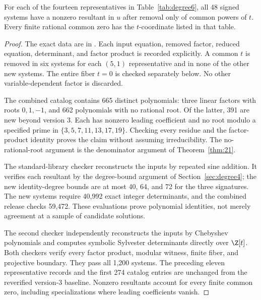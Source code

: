 \begin{lemma}\label{lem:degree6data}
For each of the fourteen representatives in Table~\ref{tab:degree6}, all 48 signed systems have a nonzero resultant in $u$ after removal only of common powers of $t$. Every finite rational common zero has the $t$-coordinate listed in that table.
\end{lemma}
\begin{proof}
The exact data are in . Each input equation, removed factor, reduced equation, determinant, and factor product is recorded explicitly. A common $t$ is removed in six systems for each $(5,1)$ representative and in none of the other new systems. The entire fiber $t=0$ is checked separately below. No other variable-dependent factor is discarded.

The combined catalog contains 665 distinct polynomials: three linear factors with roots $0,1,-1$, and 662 polynomials with no rational root. Of the latter, 391 are new beyond version 3. Each has nonzero leading coefficient and no root modulo a specified prime in $\{3,5,7,11,13,17,19\}$. Checking every residue and the factor-product identity proves the claim without assuming irreducibility. The no-rational-root argument is the denominator argument of Theorem~\ref{thm:21}.

The standard-library checker reconstructs the inputs by repeated sine addition. It verifies each resultant by the degree-bound argument of Section~\ref{sec:degree4}; the new identity-degree bounds are at most 40, 64, and 72 for the three signatures. The new systems require 40,992 exact integer determinants, and the combined release checks 59,472. These evaluations prove polynomial identities, not merely agreement at a sample of candidate solutions.

The second checker independently reconstructs the inputs by Chebyshev polynomials and computes symbolic Sylvester determinants directly over $\Z[t]$. Both checkers verify every factor product, modular witness, finite fiber, and projective boundary. They pass all 1,200 systems. The preceding eleven representative records and the first 274 catalog entries are unchanged from the reverified version-3 baseline. Nonzero resultants account for every finite common zero, including specializations where leading coefficients vanish.
\end{proof}

